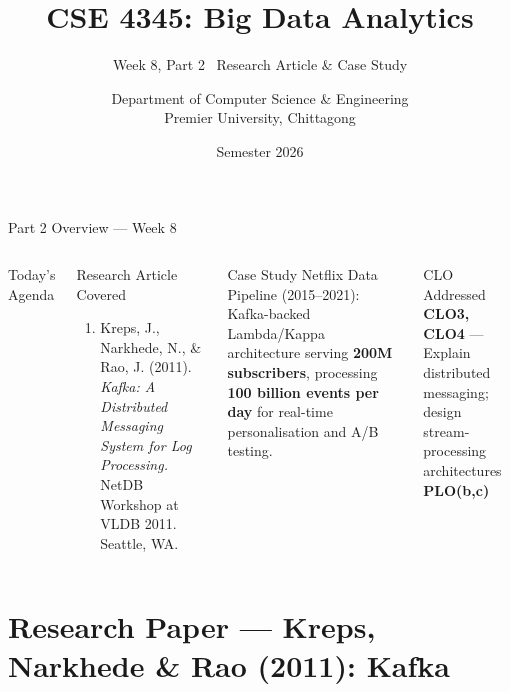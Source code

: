 \documentclass[aspectratio=169,10pt]{beamer}
\title[CSE 4345 \textbar{} Week 8, Part 2]{CSE 4345: Big Data Analytics}
\subtitle{Week 8, Part 2 \textemdash\ Research Article \& Case Study}
\author[Dept.\ of CSE]{Department of Computer Science \& Engineering\\[4pt]
       \small Premier University, Chittagong}
\institute{}
\date{Semester 2026}
\begin{document}

\begin{frame}
  \titlepage
\end{frame}

\begin{frame}{Part 2 Overview — Week 8}
  \begin{columns}[T]
      \begin{block}{Today's Agenda}
        \tableofcontents
      \end{block}

      \begin{exampleblock}{Research Article Covered}
        \begin{enumerate}
          \item Kreps, J., Narkhede, N., \& Rao, J. (2011).
                \textit{Kafka: A Distributed Messaging System
                for Log Processing.}
                NetDB Workshop at VLDB 2011.
                Seattle, WA.
        \end{enumerate}
      \end{exampleblock}
      \vspace{6pt}
      \begin{alertblock}{Case Study}
        Netflix Data Pipeline (2015--2021):
        Kafka-backed Lambda/Kappa architecture serving
        \textbf{200M subscribers}, processing
        \textbf{100 billion events per day} for real-time
        personalisation and A/B testing.
      \end{alertblock}
      \vspace{4pt}
      \begin{block}{CLO Addressed}
        \textbf{CLO3, CLO4} — Explain distributed messaging;
        design stream-processing architectures\\
        \textbf{PLO(b,c)}
      \end{block}
  \end{columns}
\end{frame}

\section{Research Paper — Kreps, Narkhede \& Rao (2011): Kafka}
\end{document}

